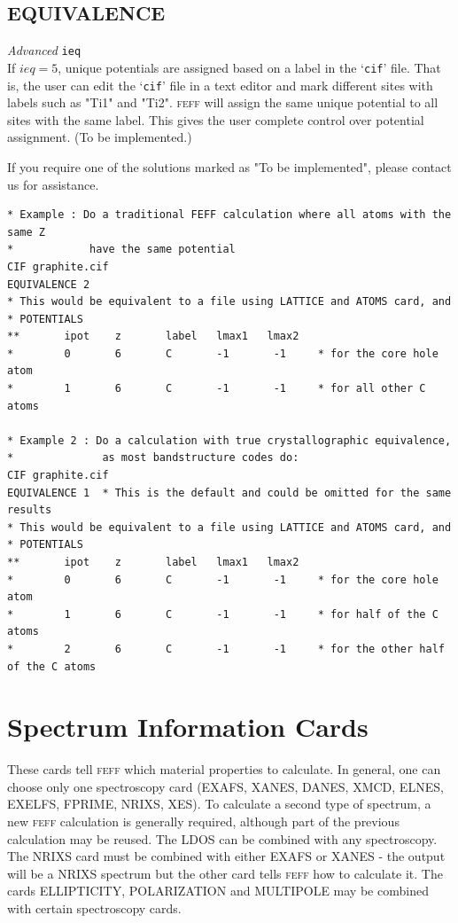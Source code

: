 \documentclass[11pt,oneside]{report} %
\newcommand{\program}[1]{\textsc{#1}}
\newcommand{\feff}{\program{feff}}
\newenvironment{Card}[4]%
      {\vspace{3ex}%
        \subsection{#1}
        \quad\textsl{#3}\newline
        \quad\texttt{#2}\newline%
        \label{card:#4}\\}
      {}
\newcommand{\file}[1]{`\texttt{#1}'}
\begin{document}
\begin{Card}{EQUIVALENCE}{ieq}{Advanced}{equ}
If $ieq=5$, unique potentials are assigned based on a label in the \file{cif} file.  That is, the user can edit the \file{cif} file in a text editor and mark different sites with labels such as "Ti1" and "Ti2".  {\feff} will
assign the same unique potential to all sites with the same label.  This gives the user complete control over potential assignment.  (To be implemented.)

If you require one of the solutions marked as "To be implemented", please contact us for assistance.

\begin{verbatim}
* Example : Do a traditional FEFF calculation where all atoms with the same Z
*            have the same potential
CIF graphite.cif
EQUIVALENCE 2
* This would be equivalent to a file using LATTICE and ATOMS card, and
* POTENTIALS
**       ipot    z       label   lmax1   lmax2
*        0       6       C       -1       -1     * for the core hole atom  
*        1       6       C       -1       -1     * for all other C atoms

* Example 2 : Do a calculation with true crystallographic equivalence,
*              as most bandstructure codes do:
CIF graphite.cif
EQUIVALENCE 1  * This is the default and could be omitted for the same results
* This would be equivalent to a file using LATTICE and ATOMS card, and
* POTENTIALS
**       ipot    z       label   lmax1   lmax2
*        0       6       C       -1       -1     * for the core hole atom 
*        1       6       C       -1       -1     * for half of the C atoms
*        2       6       C       -1       -1     * for the other half of the C atoms
\end{verbatim}
\end{Card}



\section{Spectrum Information Cards}
\label{sec:Spectrum-Information-Cards}

These cards tell {\feff} which material properties to calculate.  In general, one can choose only one spectroscopy card
(EXAFS, XANES, DANES, XMCD, ELNES, EXELFS, FPRIME, NRIXS, XES).  To calculate a second type of spectrum, a new {\feff} calculation
is generally required, although part of the previous calculation may be reused.  The LDOS can be combined with any spectroscopy.  The NRIXS card must
be combined with either EXAFS or XANES - the output will be a NRIXS spectrum but the other card tells {\feff} how to calculate it.
The cards ELLIPTICITY, POLARIZATION and MULTIPOLE may be combined with certain spectroscopy cards.
\end{document}
